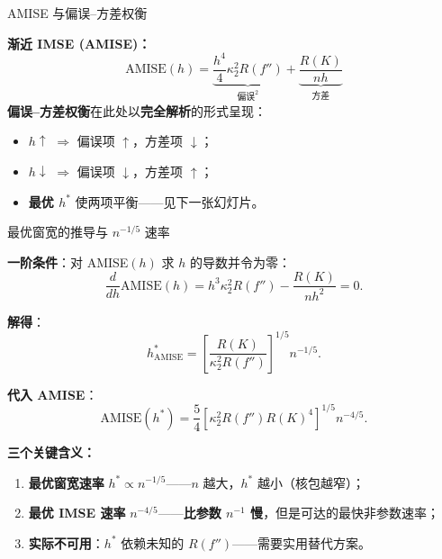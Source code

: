 \documentclass[aspectratio=169, 10pt]{beamer}
\begin{document}
\begin{frame}{AMISE 与偏误--方差权衡}

  \begin{highlightbox}
    \textbf{渐近 IMSE (AMISE)：}
    \[
      \boxed{\;\text{AMISE}(h) = \underbrace{\frac{h^4}{4}\kappa_2^2 R(f'')}_{\text{偏误}^2} + \underbrace{\frac{R(K)}{nh}}_{\text{方差}}\;}
    \]
    \textbf{偏误--方差权衡}在此处以\textbf{完全解析}的形式呈现：
    \begin{itemize}
      \item $h\uparrow$ $\Rightarrow$ 偏误项 $\uparrow$，方差项 $\downarrow$；
      \item $h\downarrow$ $\Rightarrow$ 偏误项 $\downarrow$，方差项 $\uparrow$；
      \item \textbf{最优 $h^*$} 使两项平衡——见下一张幻灯片。
    \end{itemize}
  \end{highlightbox}

\end{frame}


\begin{frame}{最优窗宽的推导与 $n^{-1/5}$ 速率}

  \textbf{一阶条件}：对 AMISE$(h)$ 求 $h$ 的导数并令为零：
  \[
    \frac{d}{dh}\text{AMISE}(h) = h^3 \kappa_2^2 R(f'') - \frac{R(K)}{nh^2} = 0.
  \]

  \textbf{解得}：
  \[
    \boxed{\;h^*_{\text{AMISE}} = \left[\frac{R(K)}{\kappa_2^2 R(f'')}\right]^{1/5} n^{-1/5}.\;}
  \]

  \textbf{代入 AMISE}：
  \[
    \text{AMISE}(h^*) = \frac{5}{4}\left[\kappa_2^2 R(f'') R(K)^4\right]^{1/5} n^{-4/5}.
  \]

  \begin{keybox}
    \textbf{三个关键含义：}
    \begin{enumerate}
      \item \textbf{最优窗宽速率} $h^*\propto n^{-1/5}$——$n$ 越大，$h^*$ 越小（核包越窄）；
      \item \textbf{最优 IMSE 速率} $n^{-4/5}$——\textbf{比参数 $n^{-1}$ 慢}，但是可达的最快非参数速率；
      \item \textbf{实际不可用}：$h^*$ 依赖未知的 $R(f'')$——需要实用替代方案。
    \end{enumerate}
  \end{keybox}
  \hypertarget{main-b7}{}\hfill{\scriptsize\hyperlink{proof-b7}{}}

\end{frame}
\end{document}

